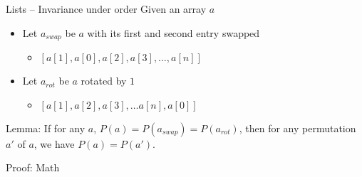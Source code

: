 \documentclass[usenames,dvipsnames]{beamer}
\begin{document}
\begin{frame}[fragile]{Lists -- Invariance under order}
  Given an array $a$
  \begin{itemize}
    \item Let $a_{swap}$ be $a$ with its first and second entry swapped
    \begin{itemize}
      \item $[ a[1], a[0], a[2], a[3], \ldots, a[n] ]$
    \end{itemize}
    \item Let $a_{rot}$ be $a$ rotated by $1$
    \begin{itemize}
      \item $[ a[1], a[2], a[3], \ldots  a[n], a[0] ]$
    \end{itemize}
  \end{itemize}
  \vfill
  Lemma: If for any $a$, $P(a) = P(a_{swap}) = P(a_{rot})$,
  then for any permutation $a'$ of $a$,
  we have $P(a) = P(a')$.

  Proof: Math
\end{frame}
\end{document}
